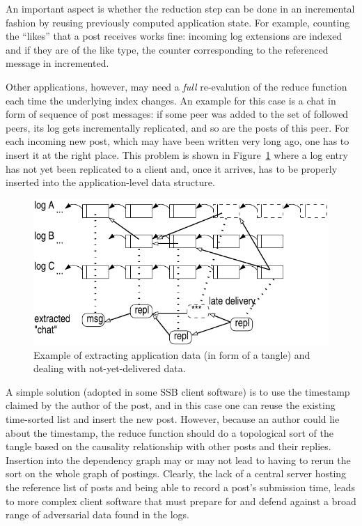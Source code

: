 \documentclass[10pt,sigconf,rewiew]{acmart}
\begin{document}
An important aspect is whether the reduction step can be done in an
incremental fashion by reusing previously computed application state.
For example, counting the ``likes'' that a post receives works fine:
incoming log extensions are indexed and if they are of the like type,
the counter corresponding to the referenced message in incremented.

Other applications, however, may need a {\em full} re-evalution of the
reduce function each time the underlying index changes. An example for
this case is a chat in form of sequence of post messages: if some peer was added to
the set of followed peers, its log gets incrementally replicated, and
so are the posts of this peer. For each incoming new post, which may
have been written very long ago, one has to insert it at the right
place. This problem is shown in Figure~\ref{fig:tangle} where a log
entry has not yet been replicated to a client and, once it arrives,
has to be properly inserted into the application-level data structure.

\begin{figure}[htb]
  \includegraphics[width=0.9\columnwidth]{figs/tangle.pdf}
  \caption{Example of extracting application data (in form of
    a tangle) and dealing
    with not-yet-delivered data.\label{fig:tangle}}
\end{figure}

A simple solution (adopted in some SSB client software) is to use the
timestamp claimed by the author of the post, and in this case one can
reuse the existing time-sorted list and insert the new post. However,
because an author could lie about the timestamp, the reduce function
should do a topological sort of the tangle based on the causality relationship with
other posts and their replies. Insertion into the dependency graph may
or may not lead to having to rerun the sort on the whole graph of
postings. Clearly, the lack of a central server hosting the reference
list of posts and being able to record a post's submission time, leads
to more complex client software that must prepare for and defend
against a broad range of adversarial data found in the logs.
\end{document}
